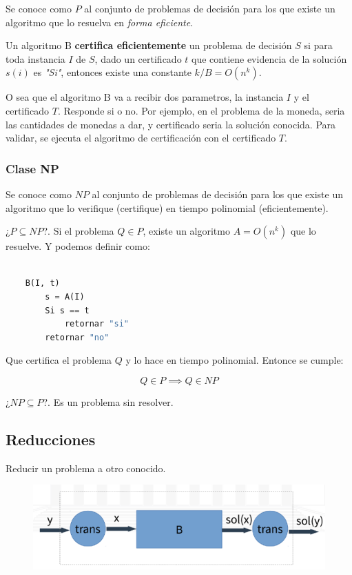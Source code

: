 \documentclass{article}
\begin{document}
Se conoce como \(P\) al conjunto de problemas de decisión para los que existe un algoritmo que lo resuelva en
\textit{forma eficiente}.

Un algoritmo B \textbf{certifica eficientemente} un problema de decisión \(S\)  si para toda instancia \(I\) de \(S\),
dado un certificado \(t\) que contiene evidencia de la solución \(s(i)\) es \textit{"Si"}, 
entonces existe una constante \(k / B = O(n^k)\). 

O sea que el algoritmo B va a recibir dos parametros, la instancia \(I\) y el certificado \(T\).  
Responde si o no. Por ejemplo, en el problema de la moneda, seria las cantidades de monedas a dar, 
y certificado seria la solución conocida. Para validar, se ejecuta el algoritmo de certificación
con el certificado \(T\).


\subsubsection{Clase NP}

Se conoce como \(NP\) al conjunto de problemas de decisión para los que existe un algoritmo
que lo verifique (certifique) en tiempo polinomial (eficientemente).

¿\(P \subseteq NP\)?. Si el problema \(Q \in P\), existe un algoritmo \( A = O(n^k)\) que lo resuelve. Y podemos definir como:

\begin{lstlisting}[language=Python, caption=Algoritmo B]

    B(I, t)
        s = A(I)
        Si s == t
            retornar "si"
        retornar "no"

\end{lstlisting}

Que certifica el problema \(Q\) y lo hace en tiempo polinomial. Entonce se cumple:

\[
    Q \in P \implies Q \in NP
\]

¿\(NP \subseteq P\)?. Es un problema sin resolver.


\subsection{Reducciones}

Reducir un problema a otro conocido.

\begin{figure}[h!]
    \includegraphics[width=\linewidth]{imagenes/reduccion.png}
\end{figure}
\end{document}
